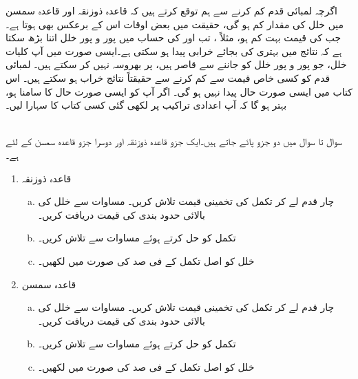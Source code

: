 اگرچہ لمبائی قدم  کم کرنے سے ہم توقع کرتے ہیں کہ قاعدہ ذوزنقہ اور قاعدہ سمسن میں خلل کی مقدار کم ہو گی، حقیقت میں بعض اوقات اس کے برعکس بھی ہوتا ہے۔جب  کی قیمت بہت کم ہو، مثلاً ، تب  اور  کی حساب میں پور و پور خلل اتنا بڑھ سکتا ہے کہ نتائج میں بہتری کی بجائے خرابی پیدا ہو سکتی ہے۔ایسی صورت میں آپ کلیات خلل، جو پور و پور خلل کو جاننے سے قاصر ہیں، پر بھروسہ نہیں کر سکتے ہیں۔ لمبائی قدم  کو کسی خاص قیمت سے کم کرنے سے حقیقتاً نتائج خراب ہو سکتے ہیں۔ اس کتاب میں ایسی صورت حال پیدا نہیں ہو گی۔ اگر آپ کو ایسی صورت حال کا سامنا ہو، بہتر ہو گا کہ آپ اعدادی تراکیب پر لکھی گئی کسی کتاب کا سہارا لیں۔

\\
سوال  تا سوال  میں دو جزو پائے جاتے ہیں۔ایک جزو قاعدہ ذوزنقہ اور دوسرا جزو قاعدہ سمسن کے  لئے ہے۔
\begin{enumerate}[1.]
\item
قاعدہ ذوزنقہ
\begin{enumerate}[a.]
\item
چار قدم  لے کر تکمل کی تخمینی قیمت تلاش کریں۔ مساوات  سے خلل  کی بالائی حدود بندی کی قیمت دریافت کریں۔
\item
تکمل کو حل کرتے ہوئے مساوات  سے  تلاش کریں۔
\item
خلل  کو اصل تکمل  کے فی صد کی صورت میں لکھیں۔
\end{enumerate}
\item
قاعدہ سمسن
\begin{enumerate}[a.]
\item
چار قدم  لے کر تکمل کی تخمینی قیمت تلاش کریں۔ مساوات   سے خلل  کی بالائی حدود بندی کی قیمت دریافت کریں۔
\item
تکمل کو حل کرتے ہوئے مساوات  سے  تلاش کریں۔
\item
خلل  کو اصل تکمل  کے فی صد کی صورت میں لکھیں۔
\end{enumerate}
\end{enumerate}

